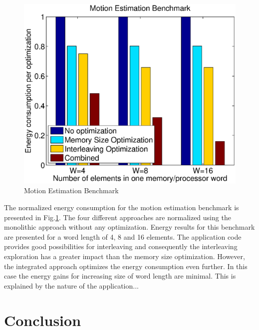 \documentclass[prodmode,acmtecs]{acmsmall}
\begin{document}
\begin{figure}
\centering
	\includegraphics[scale = 0.5]{Images/mest.eps} 
	\caption{Motion Estimation Benchmark}
	\label{fig:mest}
\end{figure}

The normalized energy consumption for the motion estimation benchmark is presented in Fig.\ref{fig:mest}.
The four different approaches are normalized using the monolithic approach without any optimization.
Energy results for this benchmark are presented for a word length of 4, 8 and 16 elements.
The application code provides good possibilities for interleaving and consequently the interleaving exploration has a greater impact than the memory size optimization.
However, the integrated approach optimizes the energy consumption even further.
In this case the energy gains for increasing size of word length are minimal.
This is explained by the nature of the application...

\section{Conclusion}
\label{sec:conclusion}
\end{document}
